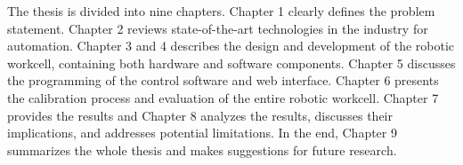 The thesis is divided into nine chapters. Chapter 1 clearly defines the 
problem statement. Chapter 2 reviews state-of-the-art technologies in the
industry for automation. Chapter 3 and 4 describes the design and development
of the robotic workcell, containing both hardware and software components.
Chapter 5 discusses the 
programming of the control software and web interface. Chapter 6 
presents the calibration process and evaluation of the entire
robotic workcell. Chapter 7 provides the results and Chapter 8 analyzes the results, discusses 
their implications, and addresses potential limitations. In the end, Chapter 9
summarizes the whole thesis and makes suggestions for
future research.